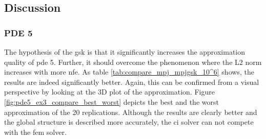 \documentclass[./\jobname.tex]{subfiles}
\begin{document}
\subsection{Discussion}
\subsubsection{PDE 5}
The hypothesis of the \gls{gsk} is that it significantly increases the approximation quality of \gls{pde} 5. Further, it should overcome the phenomenon where the L2 norm increases with more \gls{nfe}. As table \ref{tab:compare_mpj_mpjgsk_10^6} shows, the results are indeed significantly better. Again, this can be confirmed from a visual perspective by looking at the 3D plot of the approximation. Figure \ref{fig:pde5_ex3_compare_best_worst} depicts the best and the worst approximation of the 20 replications. Although the results are clearly better and the global structure is described more accurately, the \gls{ci} solver can not compete with the \gls{fem} solver. 
\end{document}
